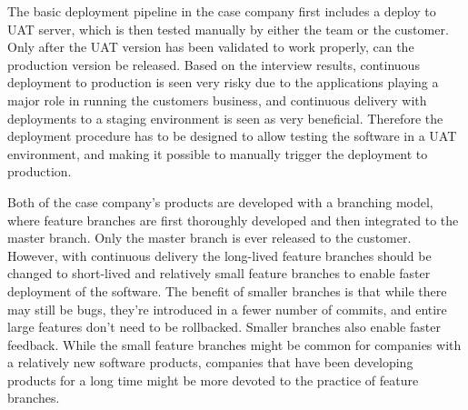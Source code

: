 \documentclass[english]{tktltiki2}
\theoremstyle{definition}
\theoremstyle{remark}
\begin{document}
The basic deployment pipeline in the case company first includes a deploy to UAT server, which is then tested manually by either the team or the customer. Only after the UAT version has been validated to work properly, can the production version be released. Based on the interview results, continuous deployment to production is seen very risky due to the applications playing a major role in running the customers business, and continuous delivery with deployments to a staging environment is seen as very beneficial. Therefore the deployment procedure has to be designed to allow testing the software in a UAT environment, and making it possible to manually trigger the deployment to production.

Both of the case company's products are developed with a branching model, where feature branches are first thoroughly developed and then integrated to the master branch. Only the master branch is ever released to the customer. However, with continuous delivery the long-lived feature branches should be changed to short-lived and relatively small feature branches to enable faster deployment of the software. The benefit of smaller branches is that while there may still be bugs, they're introduced in a fewer number of commits, and entire large features don't need to be rollbacked. Smaller branches also enable faster feedback. While the small feature branches might be common for companies with a relatively new software products, companies that have been developing products for a long time might be more devoted to the practice of feature branches.

\end{document}
